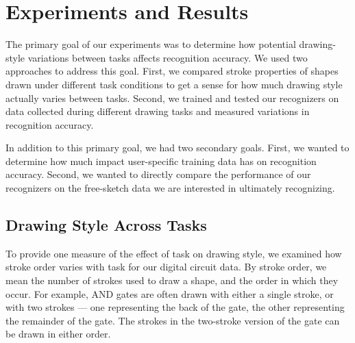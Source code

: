 \documentclass[final,5p,twocolumn]{elsarticle}
\begin{document}

\section{Experiments and Results}
The primary goal of our experiments was to determine how potential drawing-style 
variations between tasks affects recognition accuracy.  We used two approaches to
address this goal.  First, we compared stroke properties of shapes
drawn under different task conditions to get a sense for how much drawing
style actually varies between tasks.  Second, we trained and tested our recognizers
on data collected during different drawing tasks and measured variations in
recognition accuracy.  

In addition to this primary goal, we had two secondary goals.
First, we wanted to
determine how much impact user-specific training data has on recognition
accuracy.  Second, we wanted to directly compare the performance of our recognizers
on the free-sketch data we are interested in ultimately recognizing.

\subsection{Drawing Style Across Tasks}
\label{style}

To provide one measure of the effect of task on drawing style, we
examined how stroke order varies with task for our digital circuit
data. By stroke order, we mean the number of strokes used to draw a
shape, and the order in which they occur. For example, AND gates are
often drawn with either a single stroke, or with two strokes ---  one
representing the back of the gate, the other representing the
remainder of the gate. The strokes in the two-stroke version of the
gate can be drawn in either order.
\end{document}
